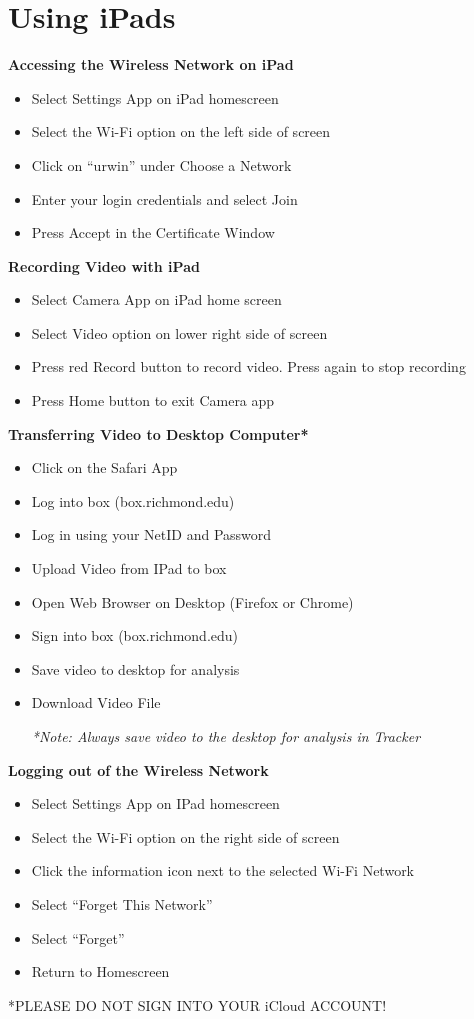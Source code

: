 ﻿\section{Using iPads}
\label{ipads}

\textbf{Accessing the Wireless Network on iPad}
\begin{itemize}[nosep]
\item Select Settings App on iPad homescreen 
\item Select the Wi-Fi option on the left side of screen
\item Click on ``urwin'' under Choose a Network
\item Enter your login credentials and select Join
\item Press Accept in the Certificate Window
\end{itemize}


\textbf{Recording Video with iPad}
\begin{itemize}[nosep]
\item Select Camera App on iPad home screen 
\item Select Video option on lower right side of screen
\item Press red Record button to record video.  Press again to stop recording
\item Press Home button to exit Camera app
\end{itemize}


\textbf{Transferring Video to  Desktop Computer*}
\begin{itemize}[nosep]
\item Click on the Safari App
\item Log into box (box.richmond.edu)
\item Log in using your NetID and Password
\item Upload Video from IPad to box
\item Open Web Browser on Desktop (Firefox or Chrome)
\item Sign into box (box.richmond.edu)
\item Save video to desktop for analysis
\item Download Video File

\textit{*Note: Always save video to the desktop for analysis in Tracker}
\end{itemize}

\textbf{Logging out of the Wireless Network}
\begin{itemize}[nosep]
\item Select Settings App on IPad homescreen 
\item Select the Wi-Fi option on the right side of screen
\item Click the information icon next to the selected Wi-Fi Network
\item Select ``Forget This Network''
\item Select ``Forget''
\item Return to Homescreen
\end{itemize}

*PLEASE DO NOT SIGN INTO YOUR iCloud ACCOUNT!



